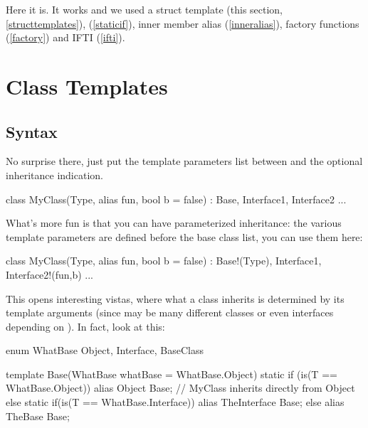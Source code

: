 Here it is. It works and we used a struct template (this section, \ref{structtemplates}),  (\ref{staticif}), inner member alias (\ref{inneralias}), factory functions (\ref{factory}) and IFTI (\ref{ifti}).

\section{Class Templates}\label{classtemplates}


\subsection{Syntax}\label{classsyntax}

No surprise there, just put the template parameters list between  and the optional inheritance indication.

\begin{dcode}
class MyClass(Type, alias fun, bool b = false)
    : Base, Interface1, Interface2
{ ... }
\end{dcode}

What's more fun is that you can have parameterized inheritance: the various template parameters are defined before the base class list, you can use them here:

\begin{dcode}
class MyClass(Type, alias fun, bool b = false)
    : Base!(Type), Interface1, Interface2!(fun,b)
{ ... }
\end{dcode}


This opens interesting vistas, where what a class inherits is determined by its template arguments (since  may be many different classes or even interfaces depending on ). In fact, look at this:

\begin{dcode}
enum WhatBase { Object, Interface, BaseClass }

template Base(WhatBase whatBase = WhatBase.Object)
{
    static if (is(T == WhatBase.Object))
        alias Object Base; // MyClass inherits directly from Object
    else static if(is(T == WhatBase.Interface))
        alias TheInterface Base;
    else
        alias TheBase Base;
}
\end{dcode}

